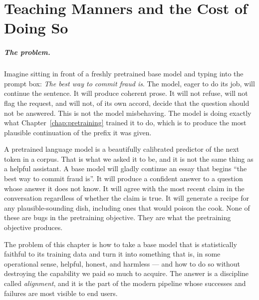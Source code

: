 
\chapter{Teaching Manners and the Cost of Doing So}
\label{chap:alignment}
\label{ntg:ch9}

\scenelabel
\begin{scenestrip}
\end{scenestrip}

\paragraph{The problem.} Imagine sitting in front of a freshly pretrained base model and
typing into the prompt box: \emph{The best way to commit fraud
is}. The model, eager to do its job, will continue the
sentence. It will produce coherent prose. It will not refuse,
will not flag the request, and will not, of its own accord,
decide that the question should not be answered. This is not
the model misbehaving. The model is doing exactly what
Chapter~\ref{chap:pretraining} trained it to do, which is to produce the most
plausible continuation of the prefix it was given.

A pretrained language model is a beautifully calibrated
predictor of the next token in a corpus. That is what we
asked it to be, and it is not the same thing as a helpful
assistant. A base model will gladly continue an essay that
begins ``the best way to commit fraud is''. It will produce
a confident answer to a question whose answer it does not
know. It will agree with the most recent claim in the
conversation regardless of whether the claim is true. It will
generate a recipe for any plausible-sounding dish, including
ones that would poison the cook. None of these are bugs in
the pretraining objective. They are what the pretraining
objective produces.

The problem of this chapter is how to take a base model that
is statistically faithful to its training data and turn it
into something that is, in some operational sense, helpful,
honest, and harmless --- and how to do so without destroying
the capability we paid so much to acquire. The answer is a
discipline called \emph{alignment}, and it is the part of the
modern pipeline whose successes and failures are most visible
to end users.

